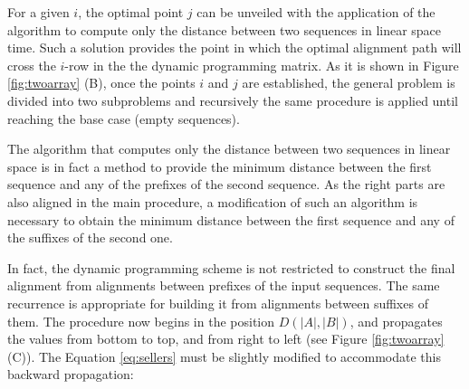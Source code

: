 For a given $i$, the optimal point $j$ can be unveiled with the application of the algorithm to compute 
only the distance between two sequences in linear space time. Such a solution provides the point in 
which the optimal alignment path will cross the $i$-row in the the dynamic programming matrix. As it is 
shown in Figure \ref{fig:twoarray} (B), once the points $i$ and $j$ are established, the general 
problem is divided into two subproblems and recursively the same procedure is applied until reaching the 
base case (empty sequences).

The algorithm that computes only the distance between two sequences in linear space is in fact a method
to provide the minimum distance between the first sequence and any of the prefixes of the second sequence. 
As the right parts are also aligned in the main procedure, a modification of such an algorithm is 
necessary to obtain the minimum distance between the first sequence and any of the suffixes of the second 
one.

In fact, the dynamic programming scheme is not restricted to construct the final alignment from 
alignments between prefixes of the input sequences. The same recurrence is appropriate for building it
from alignments between suffixes of them. The procedure now begins in the position $D(|A|,|B|)$, and
propagates the values from bottom to top, and from right to left (see Figure \ref{fig:twoarray} (C)). 
The Equation \ref{eq:sellers} must be slightly modified to accommodate this backward propagation:

\begin{center}
\end{center}

